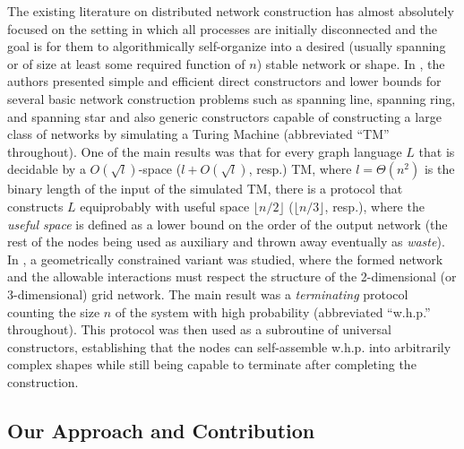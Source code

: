 \documentclass[preprint]{elsarticle}
\begin{document}
The existing literature on distributed network construction \cite{MS14,Mi15} has almost absolutely focused on the setting in which all processes are initially disconnected and the goal is for them to algorithmically self-organize into a desired (usually spanning or of size at least some required function of $n$) stable network or shape. In \cite{MS14}, the authors presented simple and efficient direct constructors and lower bounds for several basic network construction problems such as spanning line, spanning ring, and spanning star and also generic constructors capable of constructing a large class of networks by simulating a Turing Machine (abbreviated ``TM'' throughout). One of the main results was that for every graph language $L$ that is decidable by a $O(\sqrt{l})$-space ($l+O(\sqrt{l})$, resp.) TM, where $l=\Theta(n^2)$ is the binary length of the input of the simulated TM, there is a protocol that constructs $L$ equiprobably with useful space $\lfloor n/2\rfloor$ ($\lfloor n/3\rfloor$, resp.), where the \emph{useful space} is defined as a lower bound on the order of the output network (the rest of the nodes being used as auxiliary and thrown away eventually as \emph{waste}). In \cite{Mi15}, a geometrically constrained variant was studied, where the formed network and the allowable interactions must respect the structure of the 2-dimensional (or 3-dimensional) grid network. The main result was a \emph{terminating} protocol counting the size $n$ of the system with high probability (abbreviated ``w.h.p.'' throughout). This protocol was then used as a subroutine of universal constructors, establishing that the nodes can self-assemble w.h.p. into arbitrarily complex shapes while still being capable to terminate after completing the construction.

\subsection{Our Approach and Contribution}
\end{document}
